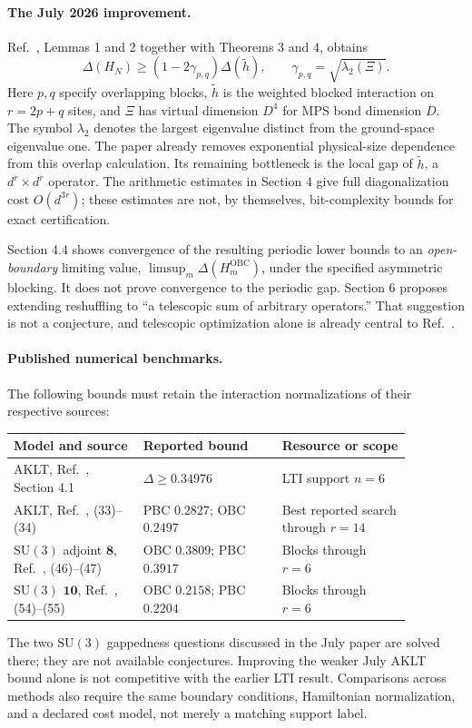 \documentclass{article}
\begin{document}
\paragraph{The July 2026 improvement.}
Ref.~\cite{RMS}, Lemmas 1 and 2 together with Theorems 3 and 4, obtains
\begin{equation}
  \Delta(H_N)\geq
  (1-2\gamma_{p,q}) \Delta(\widetilde h),
  \qquad \gamma_{p,q}=\sqrt{\lambda_2(\Xi)}.
  \label{eq:rms-bound}
\end{equation}
Here $p,q$ specify overlapping blocks, $\widetilde h$ is the weighted
blocked interaction on $r=2p+q$ sites, and $\Xi$ has virtual dimension
$D^4$ for MPS bond dimension $D$. The symbol $\lambda_2$ denotes the
largest eigenvalue distinct from the ground-space eigenvalue one.
The paper already removes exponential physical-size dependence from this
overlap calculation. Its remaining bottleneck is the local gap of
$\widetilde h$, a $d^r\times d^r$ operator. The arithmetic estimates in
Section 4 give full diagonalization cost $O(d^{3r})$; these estimates are
not, by themselves, bit-complexity bounds for exact certification.

Section 4.4 shows convergence of the resulting periodic lower bounds to
an \emph{open-boundary} limiting value,
$\limsup_m\Delta(H_m^{\mathrm{OBC}})$, under the specified asymmetric
blocking. It does not prove convergence to the periodic gap. Section 6
proposes extending reshuffling to ``a telescopic sum of arbitrary
operators.'' That suggestion is not a conjecture, and telescopic
optimization alone is already central to Ref.~\cite{LTI}.

\paragraph{Published numerical benchmarks.}
The following bounds must retain the interaction normalizations of their
respective sources:
\begin{center}
\begin{tabular}{p{0.28\linewidth}p{0.30\linewidth}p{0.29\linewidth}}
\toprule
Model and source & Reported bound & Resource or scope \\
\midrule
AKLT, Ref.~\cite{LTI}, Section 4.1
& $\Delta\geq0.34976$ & LTI support $n=6$ \\
AKLT, Ref.~\cite{RMS}, (33)--(34)
& PBC $0.2827$; OBC $0.2497$ & Best reported search through $r=14$ \\
$\mathrm{SU}(3)$ adjoint $\mathbf8$, Ref.~\cite{RMS}, (46)--(47)
& OBC $0.3809$; PBC $0.3917$ & Blocks through $r=6$ \\
$\mathrm{SU}(3)$ $\mathbf{10}$, Ref.~\cite{RMS}, (54)--(55)
& OBC $0.2158$; PBC $0.2204$ & Blocks through $r=6$ \\
\bottomrule
\end{tabular}
\end{center}
The two $\mathrm{SU}(3)$ gappedness questions discussed in the July paper
are solved there; they are not available conjectures. Improving the weaker
July AKLT bound alone is not competitive with the earlier LTI result.
Comparisons across methods also require the same boundary conditions,
Hamiltonian normalization, and a declared cost model, not merely a matching
support label.
\end{document}
